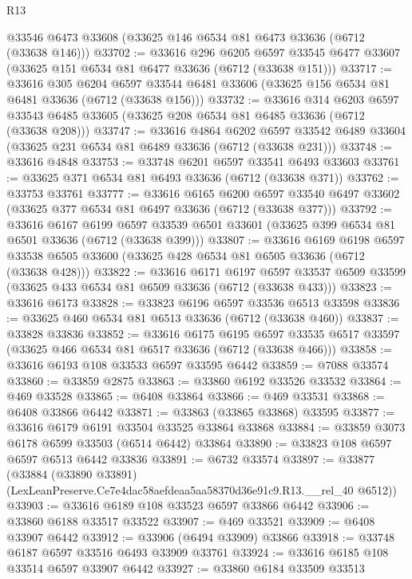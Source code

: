 \begin{lexlean}{R13}
\begin{coremodule}
    @33546
    @6473
    @33608
    (@33625 @146 @6534 @81 @6473 @33636 (@6712 (@33638 @146)))
@33702 := @33616
    @296
    @6205
    @6597
    @33545
    @6477
    @33607
    (@33625 @151 @6534 @81 @6477 @33636 (@6712 (@33638 @151)))
@33717 := @33616
    @305
    @6204
    @6597
    @33544
    @6481
    @33606
    (@33625 @156 @6534 @81 @6481 @33636 (@6712 (@33638 @156)))
@33732 := @33616
    @314
    @6203
    @6597
    @33543
    @6485
    @33605
    (@33625 @208 @6534 @81 @6485 @33636 (@6712 (@33638 @208)))
@33747 := @33616
    @4864
    @6202
    @6597
    @33542
    @6489
    @33604
    (@33625 @231 @6534 @81 @6489 @33636 (@6712 (@33638 @231)))
@33748 := @33616 @4848
@33753 := @33748 @6201 @6597 @33541 @6493 @33603
@33761 := @33625 @371 @6534 @81 @6493 @33636 (@6712 (@33638 @371))
@33762 := @33753 @33761
@33777 := @33616
    @6165
    @6200
    @6597
    @33540
    @6497
    @33602
    (@33625 @377 @6534 @81 @6497 @33636 (@6712 (@33638 @377)))
@33792 := @33616
    @6167
    @6199
    @6597
    @33539
    @6501
    @33601
    (@33625 @399 @6534 @81 @6501 @33636 (@6712 (@33638 @399)))
@33807 := @33616
    @6169
    @6198
    @6597
    @33538
    @6505
    @33600
    (@33625 @428 @6534 @81 @6505 @33636 (@6712 (@33638 @428)))
@33822 := @33616
    @6171
    @6197
    @6597
    @33537
    @6509
    @33599
    (@33625 @433 @6534 @81 @6509 @33636 (@6712 (@33638 @433)))
@33823 := @33616 @6173
@33828 := @33823 @6196 @6597 @33536 @6513 @33598
@33836 := @33625 @460 @6534 @81 @6513 @33636 (@6712 (@33638 @460))
@33837 := @33828 @33836
@33852 := @33616
    @6175
    @6195
    @6597
    @33535
    @6517
    @33597
    (@33625 @466 @6534 @81 @6517 @33636 (@6712 (@33638 @466)))
@33858 := @33616 @6193 @108 @33533 @6597 @33595 @6442
@33859 := @7088 @33574
@33860 := @33859 @2875
@33863 := @33860 @6192 @33526 @33532
@33864 := @469 @33528
@33865 := @6408 @33864
@33866 := @469 @33531
@33868 := @6408 @33866 @6442
@33871 := @33863 (@33865 @33868) @33595
@33877 := @33616 @6179 @6191 @33504 @33525 @33864 @33868
@33884 := @33859 @3073 @6178 @6599 @33503 (@6514 @6442) @33864
@33890 := @33823 @108 @6597 @6597 @6513 @6442 @33836
@33891 := @6732 @33574
@33897 := @33877
    (@33884 (@33890 @33891) (LexLeanPreserve.Ce7e4dac58aefdeaa5aa58370d36e91c9.R13.__rel_40 @6512))
@33903 := @33616 @6189 @108 @33523 @6597 @33866 @6442
@33906 := @33860 @6188 @33517 @33522
@33907 := @469 @33521
@33909 := @6408 @33907 @6442
@33912 := @33906 (@6494 @33909) @33866
@33918 := @33748 @6187 @6597 @33516 @6493 @33909 @33761
@33924 := @33616 @6185 @108 @33514 @6597 @33907 @6442
@33927 := @33860 @6184 @33509 @33513

\end{coremodule}
\end{lexlean}
